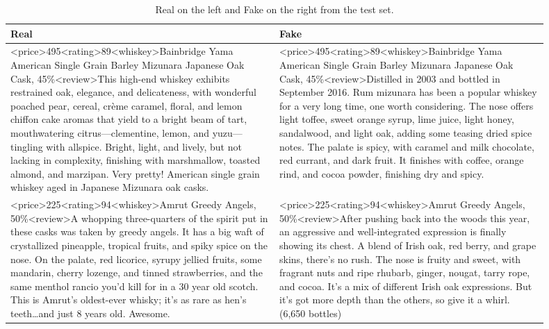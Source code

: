\documentclass{article}
\begin{document}
\begin{table}[h]
    \centering
    \begin{tabular}{p{0.45\linewidth} | p{0.45\linewidth}}
        \toprule
        \textbf{Real} & \textbf{Fake} \\
        \midrule
        <price>495<rating>89<whiskey>Bainbridge Yama American Single Grain Barley Mizunara Japanese Oak Cask, 45\%<review>This high-end whiskey exhibits restrained oak, elegance, and delicateness, with wonderful poached pear, cereal, crème caramel, floral, and lemon chiffon cake aromas that yield to a bright beam of tart, mouthwatering citrus—clementine, lemon, and yuzu—tingling with allspice. Bright, light, and lively, but not lacking in complexity, finishing with marshmallow, toasted almond, and marzipan. Very pretty! American single grain whiskey aged in Japanese Mizunara oak casks.
        &
        <price>495<rating>89<whiskey>Bainbridge Yama American Single Grain Barley Mizunara Japanese Oak Cask, 45\%<review>Distilled in 2003 and bottled in September 2016. Rum mizunara has been a popular whiskey for a very long time, one worth considering. The nose offers light toffee, sweet orange syrup, lime juice, light honey, sandalwood, and light oak, adding some teasing dried spice notes. The palate is spicy, with caramel and milk chocolate, red currant, and dark fruit. It finishes with coffee, orange rind, and cocoa powder, finishing dry and spicy.  \\
        \hline
       <price>225<rating>94<whiskey>Amrut Greedy Angels, 50\%<review>A whopping three-quarters of the spirit put in these casks was taken by greedy angels. It has a big waft of crystallized pineapple, tropical fruits, and spiky spice on the nose. On the palate, red licorice, syrupy jellied fruits, some mandarin, cherry lozenge, and tinned strawberries, and the same menthol rancio you’d kill for in a 30 year old scotch. This is Amrut's oldest-ever whisky; it's as rare as hen's teeth…and just 8 years old. Awesome. 
&
        <price>225<rating>94<whiskey>Amrut Greedy Angels, 50\%<review>After pushing back into the woods this year, an aggressive and well-integrated expression is finally showing its chest. A blend of Irish oak, red berry, and grape skins, there’s no rush. The nose is fruity and sweet, with fragrant nuts and ripe rhubarb, ginger, nougat, tarry rope, and cocoa. It’s a mix of different Irish oak expressions. But it’s got more depth than the others, so give it a whirl. (6,650 bottles)\\
        \bottomrule
    \end{tabular}
    \vspace{1em}
    \caption{Real on the left and Fake on the right from the test set.}
    \label{reviewstable}
\end{table}




\end{document}
